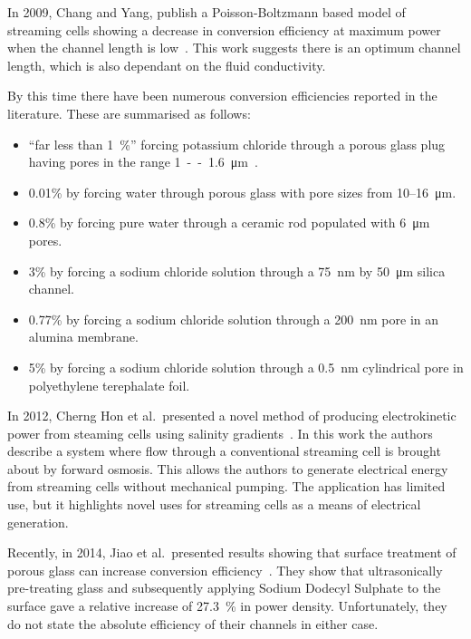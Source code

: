     In 2009, Chang and Yang, publish a Poisson-Boltzmann based model of streaming cells showing a decrease in conversion efficiency at maximum power when the channel length is low~\cite{Chang2009}.
    This work suggests there is an optimum channel length, which is also dependant on the fluid conductivity.

    By this time there have been numerous conversion efficiencies reported in the literature.
    These are summarised as follows:
    \begin{itemize}
      \item ``far less than \SI{1}{\percent}'' forcing potassium chloride through a porous glass plug having pores in the range \SI{1}--\SI{1.6}{\micro\meter}~\cite{Olthuis2005}.
      \item 0.01\% by forcing water through porous glass with pore sizes from 10\thinspace--\SI{16}{\micro\metre}.~\cite{Yang2003}
      \item 0.8\% by forcing pure water through a ceramic rod populated with \SI{6}{\micro\metre} pores.~\cite{Yang2004}
      \item 3\% by forcing a sodium chloride solution through a \SI{75}{\nano\metre} by \SI{50}{\micro\metre} silica channel.~\cite{Heyden2007}
      \item 0.77\% by forcing a sodium chloride solution through a \SI{200}{\nano\metre} pore in an alumina membrane.~\cite{Lu2006}
      \item 5\% by forcing a sodium chloride solution through a \SI{0.5}{\nano\metre} cylindrical pore in polyethylene terephalate foil.~\cite{Xie2008}
    \end{itemize}

    In 2012, Cherng Hon et al.\ presented a novel method of producing electrokinetic power from steaming cells using salinity gradients~\cite{CherngHon2012}.
    In this work the authors describe a system where flow through a conventional streaming cell is brought about by forward osmosis.
    This allows the authors to generate electrical energy from streaming cells without mechanical pumping.
    The application has limited use, but it highlights novel uses for streaming cells as a means of electrical generation.

    Recently, in 2014, Jiao et al.\ presented results showing that surface treatment of porous glass can increase conversion efficiency~\cite{Jiao2014}.
    They show that ultrasonically pre-treating glass and subsequently applying Sodium Dodecyl Sulphate to the surface gave a relative increase of \SI{27.3}{\percent} in power density.
    Unfortunately, they do not state the absolute efficiency of their channels in either case.


